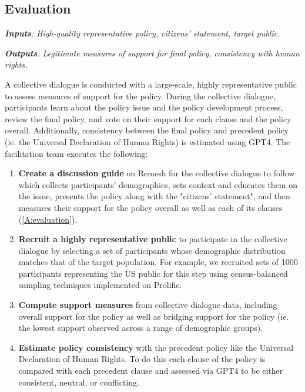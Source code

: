 \documentclass{article}
\begin{document}
 

\subsection{Evaluation}
\begin{tcolorbox}[colback=blue!5!white,colframe=blue!30!white]
\emph{\textbf{Inputs}: High-quality representative policy, citizens’ statement, target public.}

\emph{\textbf{Outputs}: Legitimate measures of support for final policy, consistency with human rights.}
\end{tcolorbox}


A collective dialogue is conducted with a large-scale, highly representative public to assess measures of support for the policy.  During the collective dialogue, participants learn about the policy issue and the policy development process, review the final policy, and vote on their support for each clause and the policy overall. Additionally, consistency between the final policy and precedent policy (ie. the Universal Declaration of Human Rights) is estimated using GPT4. The facilitation team executes the following:

\begin{enumerate}
    \item \textbf{Create a discussion guide} on Remesh for the collective dialogue to follow which collects participants' demographics, sets context and educates them on the issue, presents the policy along with the "citizens' statement", and then measures their support for the policy overall as well as each of its clauses (\ref{A:evaluation}). 
    \item \textbf{Recruit a highly representative public} to participate in the collective dialogue by selecting a set of participants whose demographic distribution matches that of the target population. For example, we recruited sets of 1000 participants representing the US public for this step using census-balanced sampling techniques implemented on Prolific.
    \item \textbf{Compute support measures} from collective dialogue data, including overall support for the policy as well as bridging support for the policy (ie. the lowest support observed across a range of demographic groups). 
    \item \textbf{Estimate policy consistency} with the precedent policy like the Universal Declaration of Human Rights. To do this each clause of the policy is compared with each precedent clause and assessed via GPT4 to be either consistent, neutral, or conflicting. 
\end{enumerate}
\end{document}
